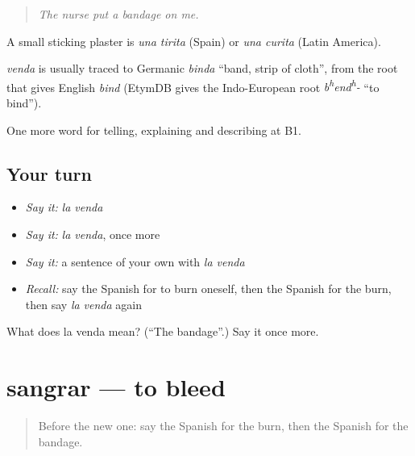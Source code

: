 \begin{quote}
\emph{The nurse put a bandage on me.}
\end{quote}

A small sticking plaster is \emph{una tirita} (Spain) or \emph{una curita} (Latin America).

\begin{cousinweb}
\emph{venda} is usually traced to Germanic \emph{binda} \textquotedblleft{}band, strip of cloth\textquotedblright{}, from the root that gives English \emph{bind} (EtymDB gives the Indo-European root \emph{b\textsuperscript{h}end\textsuperscript{h}-} \textquotedblleft{}to bind\textquotedblright{}).
\end{cousinweb}

\begin{grammarlens}[title={What you've built}]
One more word for telling, explaining and describing at B1.
\end{grammarlens}

\subsection*{Your turn}
\begin{itemize}
\raggedright
  \item \emph{Say it:} \emph{la venda}
  \item \emph{Say it:} \emph{la venda}, once more
  \item \emph{Say it:} a sentence of your own with \emph{la venda}
  \item \emph{Recall:} say the Spanish for to burn oneself, then the Spanish for the burn, then say \emph{la venda} again
\end{itemize}

\begin{tcolorbox}[breakable,colback=teal!4,colframe=teal!35!black,title={Before you move on}]
What does la venda mean? (\textquotedblleft{}The bandage\textquotedblright{}.) Say it once more.
\end{tcolorbox}
\section[sangrar]{sangrar — to bleed}

\label{lesson:ES-C734-sangrar}



\begin{quote}
Before the new one: say the Spanish for the burn, then the Spanish for the bandage.
\end{quote}

